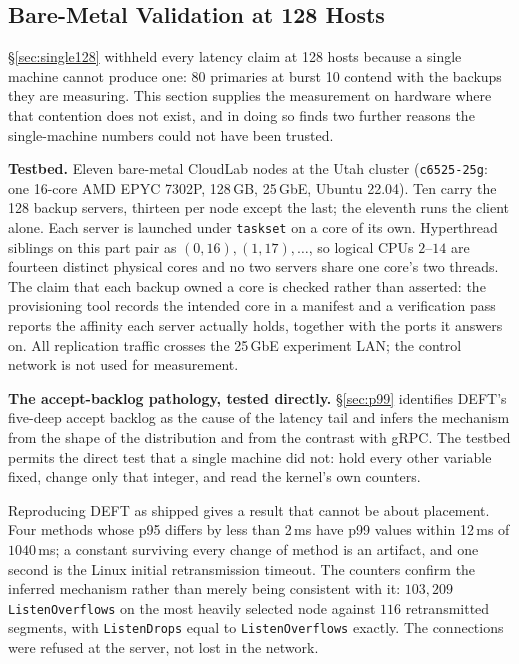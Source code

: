 \subsection{Bare-Metal Validation at 128 Hosts}
\label{sec:testbed}

\S\ref{sec:single128} withheld every latency claim at 128 hosts because a single
machine cannot produce one: 80 primaries at burst 10 contend with the backups
they are measuring. This section supplies the measurement on hardware where
that contention does not exist, and in doing so finds two further reasons the
single-machine numbers could not have been trusted.

\textbf{Testbed.} Eleven bare-metal CloudLab nodes at the Utah cluster
(\texttt{c6525-25g}: one 16-core AMD EPYC 7302P, 128\,GB, 25\,GbE, Ubuntu
22.04). Ten carry the 128 backup servers, thirteen per node except the last;
the eleventh runs the client alone. Each server is launched under
\texttt{taskset} on a core of its own. Hyperthread siblings on this part pair
as $(0,16), (1,17), \dots$, so logical CPUs $2$--$14$ are fourteen distinct
physical cores and no two servers share one core's two threads. The claim that
each backup owned a core is checked rather than asserted: the provisioning tool
records the intended core in a manifest and a verification pass reports the
affinity each server actually holds, together with the ports it answers on. All
replication traffic crosses the 25\,GbE experiment LAN; the control network is
not used for measurement.

\textbf{The accept-backlog pathology, tested directly.} \S\ref{sec:p99}
identifies DEFT's five-deep accept backlog as the cause of the latency tail and
infers the mechanism from the shape of the distribution and from the contrast
with gRPC. The testbed permits the direct test that a single machine did not:
hold every other variable fixed, change only that integer, and read the kernel's
own counters.

Reproducing DEFT as shipped gives a result that cannot be about placement. Four
methods whose p95 differs by less than 2\,ms have p99 values within 12\,ms of
$1040$\,ms; a constant surviving every change of
method is an artifact, and one second is the Linux initial retransmission
timeout. The counters confirm the inferred mechanism rather than merely being
consistent with it: $103{,}209$ \texttt{ListenOverflows} on the most heavily
selected node against $116$ retransmitted segments, with \texttt{ListenDrops}
equal to \texttt{ListenOverflows} exactly. The connections were refused at the
server, not lost in the network.

